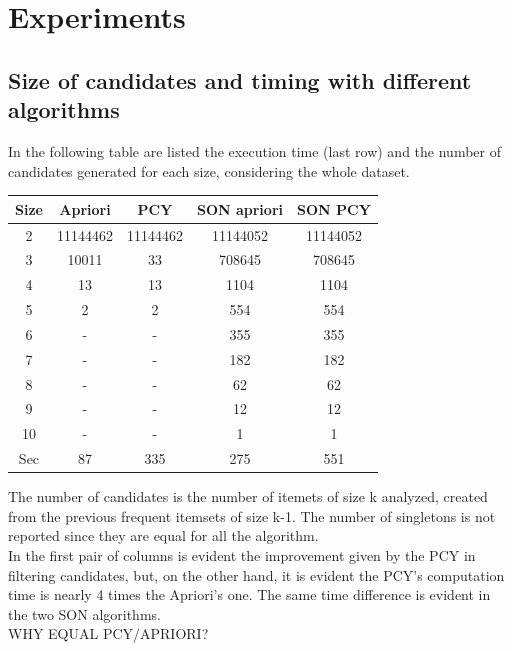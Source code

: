 \documentclass[14pt]{extarticle}
\begin{document}
\section{Experiments}
\subsection{Size of candidates and timing with different algorithms}
In the following table are listed the execution time (last row) and the number of candidates generated for each size, considering the whole dataset.
\begin{center}
\begin{tabular}{ |c|c|c|c|c| } 
 \hline
 Size & Apriori & PCY & SON apriori & SON PCY \\
 \hline
 2 & 11144462 & 11144462 & 11144052 & 11144052\\ 
 3 & 10011 & 33 & 708645 & 708645\\ 
 4 & 13 & 13 & 1104 & 1104\\ 
 5 & 2 & 2 & 554 & 554 \\
 6 & - & - & 355 & 355 \\
 7 & - & - & 182 & 182 \\
 8 & - & - & 62 & 62 \\
 9 & - & - & 12 & 12 \\
 10 & - & - & 1 & 1 \\
 \hline
 Sec & 87 & 335 & 275 & 551\\
 \hline
\end{tabular}
\end{center}
The number of candidates is the number of itemets of size k analyzed, created from the previous frequent itemsets of size k-1. The number of singletons is not reported since they are equal for all the algorithm.\\
In the first pair of columns is evident the improvement given by the PCY in filtering candidates, but, on the other hand, it is evident the PCY's computation time is nearly 4 times the Apriori's one. The same time difference is evident in the two SON algorithms.\\
WHY EQUAL PCY/APRIORI?
\end{document}
